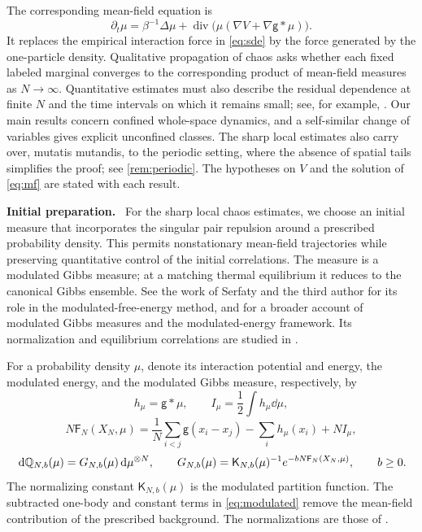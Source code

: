 \documentclass[11pt,reqno]{amsart}
\numberwithin{equation}{section}
\theoremstyle{plain}
\theoremstyle{remark}
\newcommand{\K}{\mathsf K}\newcommand{\g}{\mathsf g}\newcommand{\Fr}{\mathsf F}
\DeclareMathOperator{\diver}{div}
\newcommand{\parheading}[1]{\par\medskip\noindent\textbf{#1}\ }
\begin{document}
The corresponding mean-field equation is
\begin{equation}\label{eq:mf}
 \partial_t\mu=\beta^{-1}\Delta\mu+
    \diver\bigl(\mu(\nabla V+\nabla\g*\mu)\bigr).
\end{equation}
It replaces the empirical interaction force in \eqref{eq:sde} by the force generated by the one-particle density. Qualitative propagation of chaos asks whether each fixed labeled marginal converges to the corresponding product of mean-field measures as $N\to\infty$. Quantitative estimates must also describe the residual dependence at finite $N$ and the time intervals on which it remains small; see, for example, \cite{Lacker}. Our main results concern confined whole-space dynamics, and a self-similar change of variables gives explicit unconfined classes. The sharp local estimates also carry over, mutatis mutandis, to the periodic setting, where the absence of spatial tails simplifies the proof; see \cref{rem:periodic}. The hypotheses on $V$ and the solution of \eqref{eq:mf} are stated with each result.



\parheading{Initial preparation.}
For the sharp local chaos estimates, we choose an initial measure that incorporates the singular pair repulsion around a prescribed probability density. {This permits nonstationary mean-field trajectories while preserving quantitative control of the initial correlations.} The measure is a modulated Gibbs measure; at a matching thermal equilibrium it reduces to the canonical Gibbs ensemble. See the work of Serfaty and the third author \cite{RSlsi} for its role in the modulated-free-energy method, and \cite{SerfatyBook} for a broader account of modulated Gibbs measures and the modulated-energy framework. Its normalization and equilibrium correlations are studied in \cite{DGRpartition,DGRchaos}.



For a probability density $\mu$, denote its interaction potential and energy, the modulated energy, and the modulated Gibbs measure, respectively, by
\begin{equation}\label{eq:background}
 h_\mu=\g*\mu,\qquad I_\mu=\frac12\int h_\mu\dd\mu,
\end{equation}
\begin{equation}\label{eq:modulated}
 N\Fr_N(X_N,\mu)=\frac1N\sum_{i<j}\g(x_i-x_j)-\sum_i h_\mu(x_i)+NI_\mu,
\end{equation}
\begin{equation}\label{eq:gibbs}
 \dd\Q_{N,b}(\mu)=G_{N,b}(\mu)\dd\mu^{\otimes N},\qquad
 G_{N,b}(\mu)=\K_{N,b}(\mu)^{-1}e^{-bN\Fr_N(X_N,\mu)},\qquad b\ge0.
\end{equation}
The normalizing constant $\K_{N,b}(\mu)$ is the modulated partition function. The subtracted one-body and constant terms in \eqref{eq:modulated} remove the mean-field contribution of the prescribed background. The normalizations are those of \cite{DGRpartition,DGRchaos}.
\end{document}

